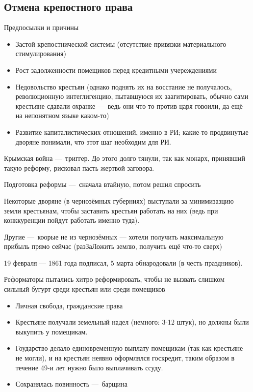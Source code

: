 \documentclass[12pt, a4paper]{article}
\begin{document}
\subsection{Отмена крепостного права}

Предпосылки и причины
\begin{itemize}
    \item Застой крепостнической системы (отсутствие привязки материального стимулирования)
    \item Рост задолженности помещиков перед кредитными учереждениями
    \item Недовольство крестьян (однако поднять их на восстание не получалось, 
    революционную интеглигенцию, пытавшуюся их заагитировать, обычно сами крестьяне сдавали охранке 
    — ведь они что-то против царя говоили, да ещё на непонятном языке каком-то)
    \item Развитие капиталистических отношений, именно в РИ; какие-то продвинутые дворяне понимали, 
    что этот шаг необходим для РИ.
\end{itemize}

Крымская война — триггер. До этого долго тянули, так как монарх, принявший такую реформу, рисковал пасть жертвой заговора.


Подготовка реформы — сначала втайную, потом решил спросить 

Некоторые дворяне (в чернозёмных губерниях) выступали за минимизазцию земли крестьянам,
чтобы заставить крестьян работать на них (ведь при конккуренции пойдут работать именно туда).

Другие — коорые не из чернозёмных — хотели получить максимальную прибыль прямо сейчас (разЗаЛожить землю, получить ещё что-то сверх)

19 февраля — 1861 года подписал, 5 марта обнародовали (в честь праздников).

Реформаторы пытались хитро реформировать, чтобы не вызвать слишком сильный бугурт среди крестьян или среди помещиков

\begin{itemize}
    \item Личная свобода, гражданские права
    \item Крестьяне получали земельный надел (немного: 3-12 штук), но должны были выкупить у помещикам.
    \item Гоударство делало единовременную выплату помещикам (так как крестьяне не могли), и на крестьян неявно оформлялся госкредит, 
    таким образом в течение 49-и лет нужно было выплачивать ссуду.
    \item Сохранялась повинность — барщина
\end{itemize}
\end{document}
